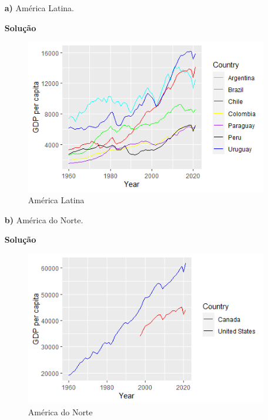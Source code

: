 \documentclass[12pt, a4paper]{article}
\begin{document}
\begin{itemize}
	\item[\textbf{a)}] América Latina.
	
	
	\textbf{Solução}
	
	
	
	
	\begin{figure}[H]
		\caption{América Latina}
		\centering
		\includegraphics[scale=1.2]{images/latin_america.png}
	\end{figure}
	
	
	
	\item[\textbf{b)}] América do Norte.
	
	
	\textbf{Solução}
	
	
	
	
	\begin{figure}[H]
		\caption{América do Norte}
		\centering
		\includegraphics[scale=1.2]{images/north_america.png}
	\end{figure}
	

\end{itemize}
\end{document}
